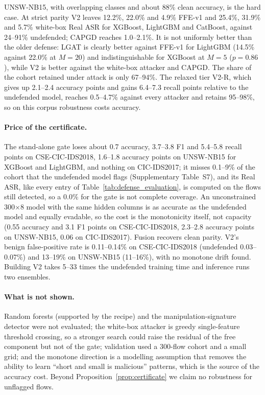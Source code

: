 UNSW-NB15, with overlapping classes and about 88\% clean accuracy, is the hard case. At strict parity V2 leaves 12.2\%, 22.0\% and 4.9\% FFE-v1 and 25.4\%, 31.9\% and 5.7\% white-box Real ASR for XGBoost, LightGBM and CatBoost, against 24--91\% undefended; CAPGD reaches 1.0--2.1\%. It is not uniformly better than the older defense: LGAT is clearly better against FFE-v1 for LightGBM (14.5\% against 22.0\% at $M=20$) and indistinguishable for XGBoost at $M=5$ ($p=0.86$), while V2 is better against the white-box attacker and CAPGD. The share of the cohort retained under attack is only 67--94\%. The relaxed tier V2-R, which gives up 2.1--2.4 accuracy points and gains 6.4--7.3 recall points relative to the undefended model, reaches 0.5--4.7\% against every attacker and retains 95--98\%, so on this corpus robustness costs accuracy.

\paragraph{Price of the certificate.} The stand-alone gate loses about 0.7 accuracy, 3.7--3.8 F1 and 5.4--5.8 recall points on CSE-CIC-IDS2018, 1.6--1.8 accuracy points on UNSW-NB15 for XGBoost and LightGBM, and nothing on CIC-IDS2017; it misses 0.1--9\% of the cohort that the undefended model flags (Supplementary Table~S7), and its Real ASR, like every entry of Table~\ref{tab:defense_evaluation}, is computed on the flows still detected, so a 0.0\% for the gate is not complete coverage. An unconstrained 300$\times$8 model with the same hidden columns is as accurate as the undefended model and equally evadable, so the cost is the monotonicity itself, not capacity (0.55 accuracy and 3.1 F1 points on CSE-CIC-IDS2018, 2.3--2.8 accuracy points on UNSW-NB15, 0.06 on CIC-IDS2017). Fusion recovers clean parity. V2's benign false-positive rate is 0.11--0.14\% on CSE-CIC-IDS2018 (undefended 0.03--0.07\%) and 13--19\% on UNSW-NB15 (11--16\%), with no monotone drift found. Building V2 takes 5--33 times the undefended training time and inference runs two ensembles.

  \paragraph{What is not shown.} Random forests (supported by the recipe) and the manipulation-signature detector were not evaluated; the white-box attacker is greedy single-feature threshold crossing, so a stronger search could raise the residual of the free component but not of the gate; validation used a 300-flow cohort and a small grid; and the monotone direction is a modelling assumption that removes the ability to learn ``short and small is malicious'' patterns, which is the source of the accuracy cost. Beyond Proposition~\ref{prop:certificate} we claim no robustness for unflagged flows.
